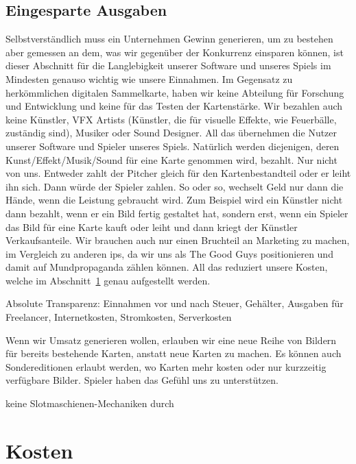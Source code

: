 \documentclass[fontsize=12, a4aper]{scrartcl}
\begin{document}

\subsection{Eingesparte Ausgaben} \label{subsec:Eingesparte_Ausgaben}

Selbstverständlich muss ein Unternehmen Gewinn generieren, um zu bestehen aber gemessen an dem, was wir gegenüber der Konkurrenz einsparen können, ist dieser Abschnitt für die Langlebigkeit unserer Software und unseres Spiels im Mindesten genauso wichtig wie unsere Einnahmen. Im Gegensatz zu herkömmlichen digitalen Sammelkarte, haben wir keine Abteilung für Forschung und Entwicklung und keine für das Testen der Kartenstärke. Wir bezahlen auch keine Künstler, VFX Artists (Künstler, die für visuelle Effekte, wie Feuerbälle, zuständig sind), Musiker oder Sound Designer. All das übernehmen die Nutzer unserer Software und Spieler unseres Spiels. Natürlich werden diejenigen, deren Kunst/Effekt/Musik/Sound für eine Karte genommen wird, bezahlt. Nur nicht von uns. Entweder zahlt der Pitcher gleich für den Kartenbestandteil oder er leiht ihn sich. Dann würde der Spieler zahlen. So oder so, wechselt Geld nur dann die Hände, wenn die Leistung gebraucht wird. Zum Beispiel wird ein Künstler nicht dann bezahlt, wenn er ein Bild fertig gestaltet hat, sondern erst, wenn ein Spieler das Bild für eine Karte kauft oder leiht und dann kriegt der Künstler Verkaufsanteile. Wir brauchen auch nur einen Bruchteil an Marketing zu machen, im Vergleich zu anderen \acp{ip}, da wir uns als \glqq The Good Guys\grqq{} positionieren und damit auf Mundpropaganda zählen können. All das reduziert unsere Kosten, welche im Abschnitt~\ref{sec:Kosten} genau aufgestellt werden.

Absolute Transparenz: Einnahmen vor und nach Steuer, Gehälter, Ausgaben für Freelancer, Internetkosten, Stromkosten, Serverkosten

Wenn wir Umsatz generieren wollen, erlauben wir eine neue Reihe von Bildern für bereits bestehende Karten, anstatt neue Karten zu machen. Es können auch Sondereditionen erlaubt werden, wo Karten mehr kosten oder nur kurzzeitig verfügbare Bilder. Spieler haben das Gefühl uns zu unterstützen.

keine Slotmaschienen-Mechaniken durch 

\section{Kosten} \label{sec:Kosten}
\end{document}
